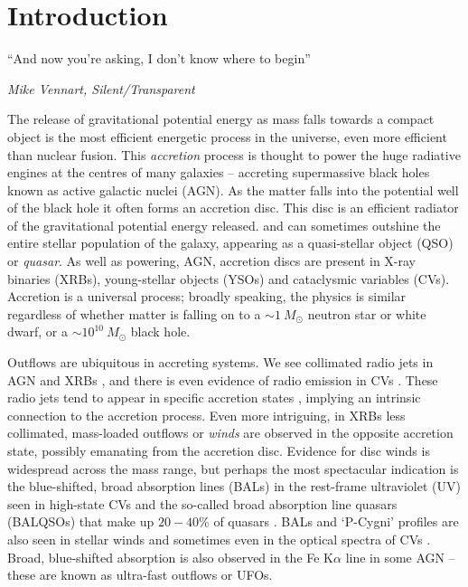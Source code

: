 \chapter{Introduction}

\epigraph{``And now you're asking, I don't know where to begin''}{{\sl Mike Vennart, Silent/Transparent}}
%

The release of gravitational potential energy as mass falls towards
a compact object is the most efficient energetic process in the universe,
even more efficient than nuclear fusion.
This {\em accretion} process is thought to power the huge radiative engines at the 
centres of many galaxies -- accreting supermassive black holes 
known as active galactic nuclei (AGN).
As the matter falls into the potential well of the 
black hole it often forms an accretion disc.
This disc is an efficient radiator of the gravitational potential energy released.
and can sometimes outshine the entire stellar population of the galaxy,
appearing as a quasi-stellar object (QSO) or {\em quasar}. 
As well as powering, AGN, 
accretion discs are present in X-ray binaries (XRBs), young-stellar objects (YSOs) and
cataclysmic variables (CVs). Accretion is a universal process; 
broadly speaking, the physics is similar regardless of 
whether matter is falling on to a $\sim1~M_\odot$ neutron star or white dwarf,
or a $\sim10^{10}~M_\odot$ black hole. 

Outflows are ubiquitous in accreting systems. We see collimated radio jets in AGN 
\citep{hazard1963,potash1980,perley1984,marscher2006} and XRBs \citep{bellonijet2010}, 
and there is even evidence of radio emission in 
CVs \citep{benz1983,coppejans2015}. 
These radio jets tend to appear in specific 
accretion states \citep{fender2001,fender2004,kordingDNjet2008}, 
implying an intrinsic connection to the 
accretion process. Even more intriguing, in XRBs less collimated, mass-loaded outflows
or {\em winds} are observed in the opposite accretion state, possibly emanating from the accretion disc.
Evidence for disc winds is widespread across the mass range, but perhaps the most spectacular indication
is the blue-shifted, broad absorption lines (BALs) in the rest-frame ultraviolet (UV)
seen in high-state CVs \citep{heap1978,greensteinoke1982,cordova1982}
and the so-called broad absorption line quasars (BALQSOs) that make up $20-40\%$
of quasars \citep{weymann1991,knigge2008,allen2011}. 
BALs and `P-Cygni' profiles \citep{struve1935,rottenburg1952}
are also seen in stellar winds \citep[e.g.][]{cassinelli1979} and sometimes even
in the optical spectra of CVs \citep{patterson1996, RN98, kafka2004}. 
Broad, blue-shifted absorption is also observed in the Fe K$\alpha$ line in 
some AGN \citep{reeves2003,poundsreeves2009,tombesi2010a} -- these are known
as ultra-fast outflows or UFOs.

